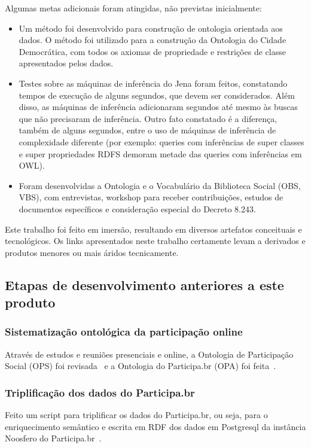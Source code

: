 \documentclass[12pt]{article}
\begin{document}
Algumas metas adicionais foram atingidas, não previstas inicialmente:
\begin{itemize}
    \item Um método foi desenvolvido para construção de ontologia orientada aos dados. O método foi utilizado para a construção da Ontologia do Cidade Democrática, com todos os axiomas de propriedade e restrições de classe apresentados pelos dados.
    \item Testes sobre as máquinas de inferência do Jena foram feitos, constatando tempos de execução de alguns segundos, que devem ser considerados. Além disso, as máquinas de inferência adicionaram segundos até mesmo às buscas que não precisaram de inferência. Outro fato constatado é a diferença, também de alguns segundos, entre o uso de máquinas de inferência de complexidade diferente (por exemplo: queries com inferências de super classes e super propriedades RDFS demoram metade das queries com inferências em OWL).
    \item Foram desenvolvidas a Ontologia e o Vocabulário da Biblioteca Social (OBS, VBS), com entrevistas, workshop para receber contribuições, estudos de documentos específicos e consideração especial do Decreto 8.243.
\end{itemize}

Este trabalho foi feito em imersão, resultando em diversos artefatos conceituais e tecnológicos. Os links apresentados neste trabalho certamente levam a derivados e produtos menores ou mais áridos tecnicamente.

\subsection{Etapas de desenvolvimento anteriores a este produto}
\subsubsection{Sistematização ontológica da participação online}
Através de estudos e reuniões presenciais e online, a Ontologia de Participação Social (OPS) foi revisada~\cite{OPS} e a Ontologia do Participa.br (OPA) foi feita~\cite{OPA}.
\subsubsection{Triplificação dos dados do Participa.br}
Feito um script para triplificar os dados do Participa.br, ou seja, para o enriquecimento semântico e escrita em RDF dos dados em Postgresql da instância Noosfero do Participa.br~\cite{triplifica}.
\end{document}
